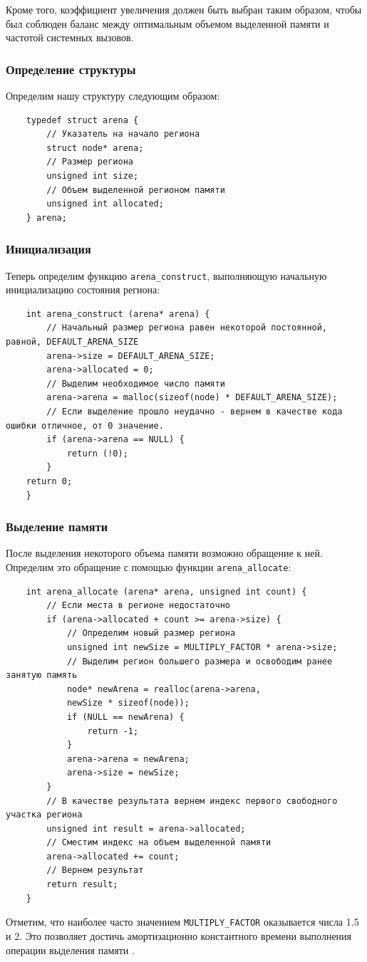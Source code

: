 \documentclass[coursework]{SCWorks}
\begin{document}
Кроме того, коэффициент увеличения должен быть выбран таким образом, чтобы был 
соблюден баланс между оптимальным объемом выделенной памяти и частотой системных
вызовов.

\subsubsection{Определение структуры}
Определим нашу структуру следующим образом:
\begin{verbatim}
    typedef struct arena {
        // Указатель на начало региона
        struct node* arena;
        // Размер региона
        unsigned int size;
        // Объем выделенной регионом памяти
        unsigned int allocated;
    } arena;
\end{verbatim}

\subsubsection{Инициализация}
Теперь определим функцию \verb|arena_construct|, выполняющую начальную 
инициализацию состояния региона:
\begin{verbatim}
    int arena_construct (arena* arena) {
        // Начальный размер региона равен некоторой постоянной, равной, DEFAULT_ARENA_SIZE
        arena->size = DEFAULT_ARENA_SIZE;
        arena->allocated = 0;
        // Выделим необходимое число памяти
        arena->arena = malloc(sizeof(node) * DEFAULT_ARENA_SIZE);
        // Если выделение прошло неудачно - вернем в качестве кода ошибки отличное, от 0 значение.
        if (arena->arena == NULL) {
            return (!0);
        }
    return 0;
    }
\end{verbatim}

\subsubsection{Выделение памяти}
После выделения некоторого объема памяти возможно обращение к ней.
Определим это обращение с помощью функции \verb|arena_allocate|:
\begin{verbatim}
    int arena_allocate (arena* arena, unsigned int count) {
        // Если места в регионе недостаточно
        if (arena->allocated + count >= arena->size) {
            // Определим новый размер региона
            unsigned int newSize = MULTIPLY_FACTOR * arena->size;
            // Выделим регион большего размера и освободим ранее занятую память
            node* newArena = realloc(arena->arena,
            newSize * sizeof(node));
            if (NULL == newArena) {
                return -1;
            }
            arena->arena = newArena;
            arena->size = newSize;
        }
        // В качестве результата вернем индекс первого свободного участка региона
        unsigned int result = arena->allocated;
        // Сместим индекс на объем выделенной памяти
        arena->allocated += count;
        // Вернем результат
        return result;
    }
\end{verbatim}
Отметим, что наиболее часто значением \verb|MULTIPLY_FACTOR| оказывается числа
1.5 и 2. Это позволяет достичь амортизационно константного времени выполнения 
операции выделения памяти \cite{matrix_87}.
\end{document}
